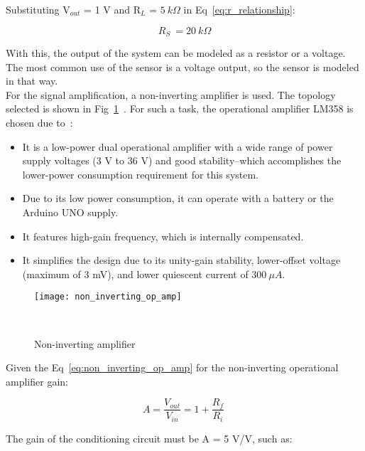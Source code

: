 Substituting V$_{out}$ = 1 V and R$_{L}$ = $5~k\Omega$ in Eq~\ref{eq:r_relationship}:

\begin{equation}
    R_{S} ~= 20~k\Omega
    \label{eq:rs_at_1v}
\end{equation}

With this, the output of the system can be modeled as a resistor or a voltage. The most common use of the sensor is a voltage output, so the sensor is modeled in that way. \\

For the signal amplification, a non-inverting amplifier is used. The topology selected is shown in Fig~\ref{fig:non_inverting_op_amp}~\cite{svoboda_2013}. For such a task, the operational amplifier LM358 is chosen due to~\cite{lm358_datasheet}:

\begin{itemize}
    \item It is a low-power dual operational amplifier with a wide range of power supply voltages (3 V to 36 V) and good stability--which accomplishes the lower-power consumption requirement for this system.

    \item Due to its low power consumption, it can operate with a battery or the Arduino UNO supply.

    \item It features high-gain frequency, which is internally compensated.

    \item It simplifies the design due to its unity-gain stability, lower-offset voltage (maximum of 3 mV), and lower quiescent current of $300~\mu A$.
\end{itemize}

\begin{figure}[H]
    \centering
    \texttt{[image: non\_inverting\_op\_amp]}
    \caption{Non-inverting amplifier}
~\label{fig:non_inverting_op_amp}
\end{figure}

Given the Eq~\ref{eq:non_inverting_op_amp} for the non-inverting operational amplifier gain:

\begin{equation}
    A = \frac{V_{out}}{V_{in}} = 1 + \frac{R_{f}}{R_{i}}
~\label{eq:non_inverting_op_amp}
\end{equation}

The gain of the conditioning circuit must be A = 5 V/V, such as:

